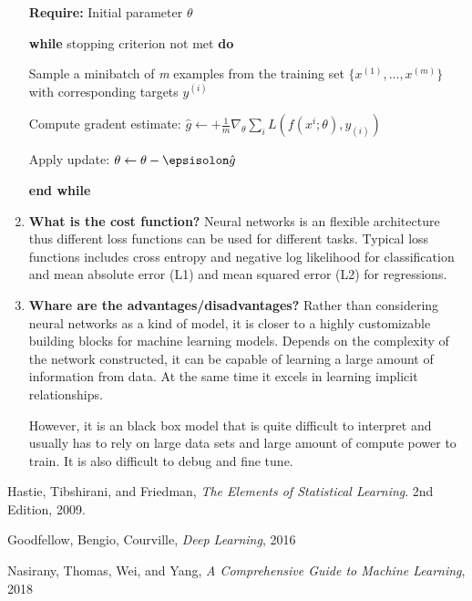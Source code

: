 \documentclass{article}
\begin{document}
\begin{enumerate}
    \textbf{Require:} Initial parameter $\theta$
    
    \qquad \textbf{while} stopping criterion not met \textbf{do}
    
    \qquad \qquad Sample a minibatch of \emph{m} examples from the training set $\{x^{(1)}, ..., x^{(m)}\}$ with corresponding targets $y^{(i)}$
    
    \qquad \qquad Compute gradent estimate: $\hat g \leftarrow + \frac{1}{m}\nabla_{\theta}\sum_{i} L(f(x^{i};\theta),y_{(i)})$
    
    \qquad \qquad Apply update: $\theta \leftarrow \theta - \epsisolon\hat g$
    
    \qquad \textbf{end while}
    \smallbreak
    \hline

    \item \textbf{What is the cost function?}
    \noindent 
    \smallbreak
    Neural networks is an flexible architecture thus different loss functions can be used for different tasks. Typical loss functions includes cross entropy and negative log likelihood for classification and mean absolute error (L1) and mean squared error (L2) for regressions.
    
    \item \textbf{Whare are the advantages/disadvantages?}
    \noindent 
    \smallbreak
    Rather than considering neural networks as a kind of model, it is closer to a highly customizable building blocks for machine learning models. Depends on the complexity of the network constructed, it can be capable of learning a large amount of information from data. At the same time it excels in learning implicit relationships. 
    
    However, it is an black box model that is quite difficult to interpret and usually has to rely on large data sets and large amount of compute power to train. It is also difficult to debug and fine tune.
    
\end{enumerate}

\begin{thebibliography}{}
Hastie, Tibshirani, and Friedman,
\emph{The Elements of Statistical Learning}.
2nd Edition,
2009.

Goodfellow, Bengio, Courville,
\emph{Deep Learning},
2016

Nasirany, Thomas, Wei, and Yang,
\emph{A Comprehensive Guide to Machine Learning},
2018

\end{thebibliography}
\end{document}
